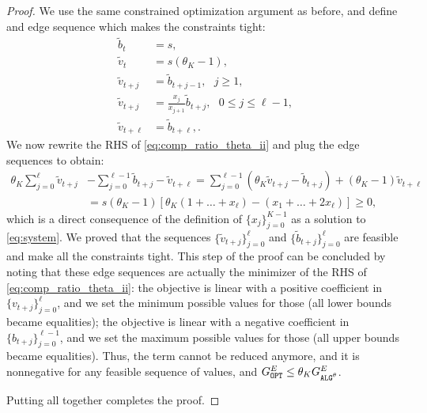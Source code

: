 \begin{proof}
    We use the same constrained optimization argument as before, and define and edge sequence which makes the constraints tight:
    \begin{align}
        \widetilde{b}_t&=s, \label{eq:edge_i2}\\
        \widetilde{v}_t&=s(\theta_K-1), \label{eq:edge_ii2}\\
        \widetilde{v}_{t+j}&=\widetilde{b}_{t+j-1},~~~ j\ge 1, \label{eq:edge_iii2}\\
        \widetilde{v}_{t+j}&=\frac{x_j}{x_{j+1}}\widetilde{b}_{t+j},~~~ 0\le j\le \ell-1,  \label{eq:edge_iv2} \\
        \widetilde{v}_{t+\ell}&=\widetilde{b}_{t+\ell}, \label{eq:edge_v2}.
    \end{align}
    We now rewrite the RHS of \eqref{eq:comp_ratio_theta_ii} and plug the edge sequences to obtain:
    \begin{align*}
        \theta_K\sum_{j=0}^{\ell}\widetilde{v}_{t+j} &- \sum_{j=0}^{\ell-1} \widetilde{b}_{t+j} - \widetilde{v}_{t+\ell} = \sum_{j=0}^{\ell-1}(\theta_K\widetilde{v}_{t+j}-\widetilde{b}_{t+j})+(\theta_K-1)\widetilde{v}_{t+\ell} \\
        &= s(\theta_K-1)\left[\theta_K(1+\ldots+x_{\ell})-(x_1+\ldots+2x_{\ell})\right] \ge 0,
    \end{align*}
    which is a direct consequence of the definition of $\{x_j\}_{j=0}^{K - 1}$ as a solution to \eqref{eq:system}. We proved that the sequences $\{\widetilde{v}_{t+j}\}_{j=0}^\ell$ and $\{\widetilde{b}_{t+j}\}_{j=0}^\ell$ are feasible and make all the constraints tight. This step of the proof can be concluded by noting that these edge sequences are actually the minimizer of the RHS of \eqref{eq:comp_ratio_theta_ii}: the objective is linear with a positive coefficient in $\{v_{t+j}\}_{j=0}^{\ell}$, and we set the minimum possible values for those (all lower bounds became equalities); the objective is linear with a negative coefficient in $\{b_{t+j}\}_{j=0}^{\ell-1}$, and we set the maximum possible values for those (all upper bounds became equalities). Thus, the term cannot be reduced anymore, and it is nonnegative for any feasible sequence of values, and $\Gopt^E\le \theta_K\Galgtheta^E$.

    Putting all together completes the proof.
\end{proof}
\upperboundthetalearn*
